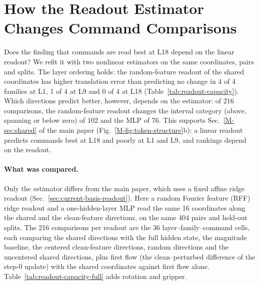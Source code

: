 \section{How the Readout Estimator Changes Command Comparisons}
\label{sec:supp-readout-capacity}

Does the finding that commands are read best at L18 depend on the linear readout? We refit it with two nonlinear estimators on the same coordinates, pairs and splits. The layer ordering holds: the random-feature readout of the shared coordinates has higher translation error than predicting no change in 4 of 4 families at L1, 1 of 4 at L9 and 0 of 4 at L18 (Table~\ref{tab:readout-capacity}). Which directions predict better, however, depends on the estimator: of 216 comparisons, the random-feature readout changes the interval category (above, spanning or below zero) of 102 and the MLP of 76. This supports Sec.~\ref*{M-sec:shared} of the main paper (Fig.~\ref*{M-fig:token-structure}b): a linear readout predicts commands best at L18 and poorly at L1 and L9, and rankings depend on the readout.

\paragraph{What was compared.}
Only the estimator differs from the main paper, which uses a fixed affine ridge readout (Sec.~\ref{sec:current-basis-readout}). Here a random Fourier feature (RFF) ridge readout and a one-hidden-layer MLP read the same 16 coordinates along the shared and the clean-feature directions, on the same 404 pairs and held-out splits. The 216 comparisons per readout are the 36 layer--family--command cells, each comparing the shared directions with the full hidden state, the magnitude baseline, the centered clean-feature directions, random directions and the uncentered shared directions, plus first flow (the clean--perturbed difference of the step-0 update) with the shared coordinates against first flow alone. Table~\ref{tab:readout-capacity-full} adds rotation and gripper.

